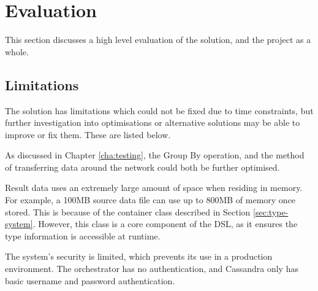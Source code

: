 \chapter{Evaluation}\label{cha:evaluation}
This section discusses a high level evaluation of the solution, and the project as a whole.

\section{Limitations}
The solution has limitations which could not be fixed due to time constraints, but further investigation into optimisations or alternative solutions may be able to improve or fix them. These are listed below.

As discussed in Chapter \ref{cha:testing}, the Group By operation, and the method of transferring data around the network could both be further optimised.



Result data uses an extremely large amount of space when residing in memory. For example, a 100MB source data file can use up to 800MB of memory once stored. This is because of the container class described in Section \ref{sec:type-system}. However, this class is a core component of the DSL, as it ensures the type information is accessible at runtime.

The system's security is limited, which prevents its use in a production environment. The orchestrator has no authentication, and Cassandra only has basic username and password authentication.

